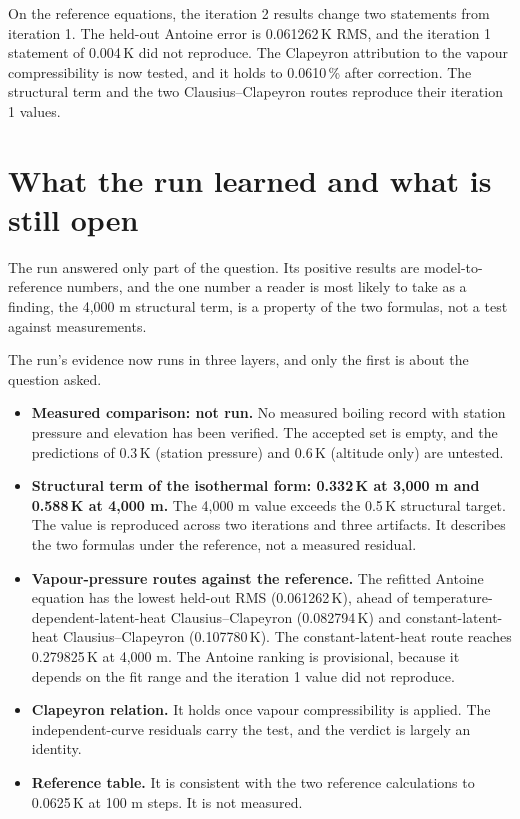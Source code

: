 \documentclass[11pt,letterpaper]{article}
\begin{document}
On the reference equations, the iteration 2 results change two statements from iteration 1. The held-out Antoine error is 0.061262\,K RMS, and the iteration 1 statement of 0.004\,K did not reproduce. The Clapeyron attribution to the vapour compressibility is now tested, and it holds to 0.0610\,\% after correction. The structural term and the two Clausius--Clapeyron routes reproduce their iteration 1 values.

\section{What the run learned and what is still open}

The run answered only part of the question. Its positive results are model-to-reference numbers, and the one number a reader is most likely to take as a finding, the 4,000 m structural term, is a property of the two formulas, not a test against measurements.

The run's evidence now runs in three layers, and only the first is about the question asked.
\begin{itemize}
\item \textbf{Measured comparison: not run.} No measured boiling record with station pressure and elevation has been verified. The accepted set is empty, and the predictions of 0.3\,K (station pressure) and 0.6\,K (altitude only) are untested.
\item \textbf{Structural term of the isothermal form: 0.332\,K at 3,000 m and 0.588\,K at 4,000 m.} The 4,000 m value exceeds the 0.5\,K structural target. The value is reproduced across two iterations and three artifacts. It describes the two formulas under the reference, not a measured residual.
\item \textbf{Vapour-pressure routes against the reference.} The refitted Antoine equation has the lowest held-out RMS (0.061262\,K), ahead of temperature-dependent-latent-heat Clausius--Clapeyron (0.082794\,K) and constant-latent-heat Clausius--Clapeyron (0.107780\,K). The constant-latent-heat route reaches 0.279825\,K at 4,000 m. The Antoine ranking is provisional, because it depends on the fit range and the iteration 1 value did not reproduce.
\item \textbf{Clapeyron relation.} It holds once vapour compressibility is applied. The independent-curve residuals carry the test, and the verdict is largely an identity.
\item \textbf{Reference table.} It is consistent with the two reference calculations to 0.0625\,K at 100 m steps. It is not measured.
\end{itemize}
\end{document}
